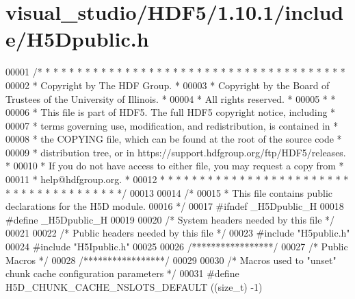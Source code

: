 \hypertarget{visual__studio_2_h_d_f5_21_810_81_2include_2_h5_dpublic_8h_source}{}\section{visual\+\_\+studio/\+H\+D\+F5/1.10.1/include/\+H5\+Dpublic.h}
\label{visual__studio_2_h_d_f5_21_810_81_2include_2_h5_dpublic_8h_source}

\begin{DoxyCode}
00001 \textcolor{comment}{/* * * * * * * * * * * * * * * * * * * * * * * * * * * * * * * * * * * * * * *}
00002 \textcolor{comment}{ * Copyright by The HDF Group.                                               *}
00003 \textcolor{comment}{ * Copyright by the Board of Trustees of the University of Illinois.         *}
00004 \textcolor{comment}{ * All rights reserved.                                                      *}
00005 \textcolor{comment}{ *                                                                           *}
00006 \textcolor{comment}{ * This file is part of HDF5.  The full HDF5 copyright notice, including     *}
00007 \textcolor{comment}{ * terms governing use, modification, and redistribution, is contained in    *}
00008 \textcolor{comment}{ * the COPYING file, which can be found at the root of the source code       *}
00009 \textcolor{comment}{ * distribution tree, or in https://support.hdfgroup.org/ftp/HDF5/releases.  *}
00010 \textcolor{comment}{ * If you do not have access to either file, you may request a copy from     *}
00011 \textcolor{comment}{ * help@hdfgroup.org.                                                        *}
00012 \textcolor{comment}{ * * * * * * * * * * * * * * * * * * * * * * * * * * * * * * * * * * * * * * */}
00013 
00014 \textcolor{comment}{/*}
00015 \textcolor{comment}{ * This file contains public declarations for the H5D module.}
00016 \textcolor{comment}{ */}
00017 \textcolor{preprocessor}{#ifndef \_H5Dpublic\_H}
00018 \textcolor{preprocessor}{#define \_H5Dpublic\_H}
00019 
00020 \textcolor{comment}{/* System headers needed by this file */}
00021 
00022 \textcolor{comment}{/* Public headers needed by this file */}
00023 \textcolor{preprocessor}{#include "H5public.h"}
00024 \textcolor{preprocessor}{#include "H5Ipublic.h"}
00025 
00026 \textcolor{comment}{/*****************/}
00027 \textcolor{comment}{/* Public Macros */}
00028 \textcolor{comment}{/*****************/}
00029 
00030 \textcolor{comment}{/* Macros used to "unset" chunk cache configuration parameters */}
00031 \textcolor{preprocessor}{#define H5D\_CHUNK\_CACHE\_NSLOTS\_DEFAULT      ((size\_t) -1)}

\end{DoxyCode}
